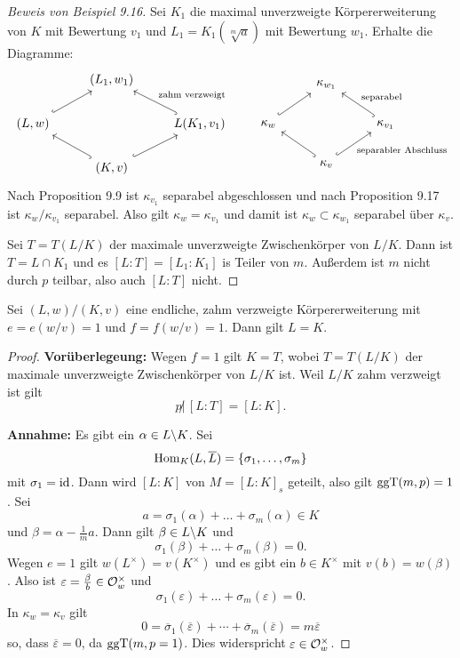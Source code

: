 
\begin{proof}[Beweis von Beispiel 9.16]
	Sei $K_1$ die maximal unverzweigte Körpererweiterung von $K$ mit Bewertung $v_1$
	und $L_1 = K_1(\sqrt[m]{a})$ mit Bewertung $w_1$. Erhalte die Diagramme:
	\[\begin{tikzcd}
	& (L_1,w_1) & \\
	(L,w)
	\arrow[hook]{ur}
	& & L (K_1, v_1)
	\arrow[hook, swap]{ul}{\text{zahm verzweigt}}
	\\
	& (K,v)
	\arrow[hook]{ur}
	\arrow[hook]{ul}
	&
	\end{tikzcd}
	\qquad 
	\begin{tikzcd}
	& \kappa_{w_1} & \\
	\kappa_{w}
	\arrow[hook]{ur}
	& & \kappa_{v_1}
	\arrow[hook, swap]{ul}{\text{separabel}}
	\\
	& \kappa_{v} 
	\arrow[hook, swap]{ur}{\text{separabler Abschluss}}
	\arrow[hook]{ul}
	&
	\end{tikzcd}
	\]
	Nach Proposition 9.9 ist $\kappa_{v_1}$ separabel abgeschlossen und nach Proposition 9.17 ist $\kappa_{w} / \kappa_{v_1}$ separabel. Also gilt $\kappa_{w}=\kappa_{v_1}$ und damit ist
	$\kappa_{w} \subset \kappa_{w_1}$ separabel über $\kappa_{v}$.
	
	\bigskip Sei $T=T(L/K)$ der maximale unverzweigte Zwischenkörper von $L/K$. Dann ist $T= L \cap K_1$ und es $[L:T] = [L_1:K_1]$ is Teiler von $m$. Außerdem ist $m$ nicht durch $p$ teilbar, also auch $[L:T]$ nicht.
\end{proof}

\begin{Prop}
	Sei $(L,w) / (K,v)$ eine endliche, zahm verzweigte Körpererweiterung mit
	$e=e(w/v) =1$ und $f=f(w/v) = 1$. Dann gilt $L=K$.
\end{Prop}

\begin{proof}
	\textbf{Vorüberlegeung:} Wegen $f=1$ gilt $K=T$, wobei $T=T(L/K)$ der maximale unverzweigte Zwischenkörper von $L/K$ ist. Weil $L/K$ zahm verzweigt ist gilt
	\[ p \not| \, [L:T] = [L:K].
	\]
	
	\textbf{Annahme:} Es gibt ein $\alpha \in L \backslash K$. Sei 
	\[ \operatorname{Hom}_K(L, \overline{L}) = \left\{ \sigma_1, \dots, \sigma_m \right\}
	\]
	mit $\sigma_1 = \operatorname{id}$. Dann wird $[L:K]$ von $M=[L:K]_s$ geteilt, also gilt $\operatorname{ggT}(m,p)=1$.
	Sei 
	\[a = \sigma_1(\alpha) + \dots + \sigma_m(\alpha) \in K
	\]
	und $\beta = \alpha - \frac{1}{m} a$.
	Dann gilt $\beta \in L \backslash K$ und 
	\[\sigma_1(\beta) + \dots + \sigma_m(\beta) = 0.
	\]
	Wegen $e=1$ gilt $w(L^\times) = v(K^\times)$ und es gibt ein $b \in K^\times$ mit $v(b)=w(\beta)$.
	Also ist $\varepsilon = \frac{\beta}{b} \in \mathcal{O}_w^\times$ und
	\[ \sigma_1(\varepsilon) + \dots + \sigma_m(\varepsilon) = 0.
	\]
	In $\kappa_w = \kappa_v$ gilt
	\[ 0 = \overline{\sigma}_1(\overline{\varepsilon}) + \cdots + \overline{\sigma}_m(\overline{\varepsilon})
	= m \overline{\varepsilon}
	\]
	so, dass $\overline{\varepsilon} = 0$, da $\operatorname{ggT}(m,p =1)$. Dies widerspricht $\varepsilon \in \mathcal{O}_w^\times$.
\end{proof}


